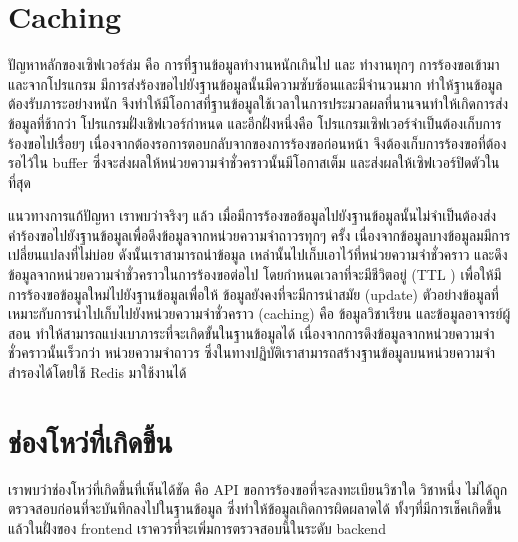 \section{Caching}

ปัญหาหลักของเซิฟเวอร์ล่ม คือ การที่ฐานข้อมูลทำงานหนักเกินไป และ ทำงานทุกๆ การร้องขอเข้ามา และจากโปรแกรม มีการส่งร้องขอไปยังฐานข้อมูลนั้นมีความซับซ้อนและมีจำนวนมาก ทำให้ฐานข้อมูลต้องรับภาระอย่างหนัก จึงทำให้มีโอกาสที่ฐานข้อมูลใช้เวลาในการประมวลผลที่นานจนทำให้เกิดการส่งข้อมูลที่ช้ากว่า โปรแกรมฝั่งเชิฟเวอร์กำหนด และอีกฝั่งหนึ่งคือ โปรแกรมเซิฟเวอร์จำเป็นต้องเก็บการร้องขอไปเรื่อยๆ เนื่องจากต้องรอการตอบกลับจากของการร้องขอก่อนหน้า จึงต้องเก็บการร้องขอที่ต้องรอไว้ใน buffer ซึ่งจะส่งผลให้หน่วยความจำชั่วคราวนั้นมีโอกาสเต็ม และส่งผลให้เซิฟเวอร์ปิดตัวในที่สุด

แนวทางการแก้ปัญหา เราพบว่าจริงๆ แล้ว เมื่อมีการร้องขอข้อมูลไปยังฐานข้อมูลนั้นไม่จำเป็นต้องส่งคำร้องขอไปยังฐานข้อมูลเพื่อดึงข้อมูลจากหน่วยความจำถาวรทุกๆ ครั้ง เนื่องจากข้อมูลบางข้อมูลมมีการเปลี่ยนแปลงที่ไม่บ่อย ดังนั้นเราสามารถนำข้อมูล เหล่านั้นไปเก็บเอาไว้ที่หน่วยความจำชั่วคราว และดึงข้อมูลจากหน่วยความจำชั่วคราวในการร้องขอต่อไป โดยกำหนดเวลาที่จะมีชีวิตอยู่ (TTL \cite{ttl}) เพื่อให้มีการร้องขอข้อมูลใหม่ไปยังฐานข้อมูลเพื่อให้ ข้อมูลยังคงที่จะมีการนำสมัย (update) ตัวอย่างข้อมูลที่เหมาะกับการนำไปเก็บไปยังหน่วยความจำชั่วคราว (caching) คือ ข้อมูลวิชาเรียน และข้อมูลอาจารย์ผู้สอน ทำให้สามารถแบ่งเบาภาระที่จะเกิดขั้นในฐานข้อมูลได้ เนื่องจากการดึงข้อมูลจากหน่วยความจำชั่วคราวนั้นเร็วกว่า หน่วยความจำถาวร ซึ่งในทางปฏิบัติเราสามารถสร้างฐานข้อมูลบนหน่วยความจำสำรองได้โดยใช้ Redis \cite{redis} มาใช้งานได้

\section{ช่องโหว่ที่เกิดขึ้น}

เราพบว่าช่องโหว่ที่เกิดขึ้นที่เห็นได้ชัด คือ API ขอการร้องขอที่จะลงทะเบียนวิชาใด วิชาหนึ่ง ไม่ได้ถูกตรวจสอบก่อนที่จะบันทึกลงไปในฐานข้อมูล ซึ่งทำให้ข้อมูลเกิดการผิดผลาดได้ ทั้งๆที่มีการเช็คเกิดขึ้นแล้วในฝั่งของ frontend เราควรที่จะเพิ่มการตรวจสอบนี้ในระดับ backend